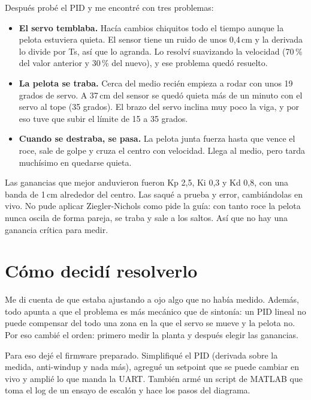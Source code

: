 \documentclass[11pt,a4paper]{article}
\begin{document}
Después probé el PID y me encontré con tres problemas:

\begin{itemize}
  \item \textbf{El servo temblaba.} Hacía cambios chiquitos todo el tiempo aunque la pelota
        estuviera quieta. El sensor tiene un ruido de unos 0,4\,cm y la derivada lo divide por
        Ts, así que lo agranda. Lo resolví suavizando la velocidad (70\,\% del valor anterior
        y 30\,\% del nuevo), y ese problema quedó resuelto.
  \item \textbf{La pelota se traba.} Cerca del medio recién empieza a rodar con unos 19 grados
        de servo. A 37\,cm del sensor se quedó quieta más de un minuto con el servo al tope
        (35 grados). El brazo del servo inclina muy poco la viga, y por eso tuve que subir el
        límite de 15 a 35 grados.
  \item \textbf{Cuando se destraba, se pasa.} La pelota junta fuerza hasta que vence el roce,
        sale de golpe y cruza el centro con velocidad. Llega al medio, pero tarda muchísimo en
        quedarse quieta.
\end{itemize}

Las ganancias que mejor anduvieron fueron Kp 2,5, Ki 0,3 y Kd 0,8, con una banda de 1\,cm
alrededor del centro. Las saqué a prueba y error, cambiándolas en vivo. No pude aplicar
Ziegler-Nichols como pide la guía: con tanto roce la pelota nunca oscila de
forma pareja, se traba y sale a los saltos. Así que no hay una ganancia crítica para medir.

\section*{Cómo decidí resolverlo}

Me di cuenta de que estaba ajustando a ojo algo que no había medido. Además, todo
apunta a que el problema es más mecánico que de sintonía: un PID lineal no puede compensar del
todo una zona en la que el servo se mueve y la pelota no. Por eso cambié el orden: primero
medir la planta y después elegir las ganancias.

Para eso dejé el firmware preparado. Simplifiqué el PID (derivada sobre la medida,
anti-windup y nada más), agregué un setpoint que se puede cambiar en vivo y amplié lo que
manda la UART. También armé un script de MATLAB que toma el log de un ensayo de escalón y
hace los pasos del diagrama.
\end{document}
